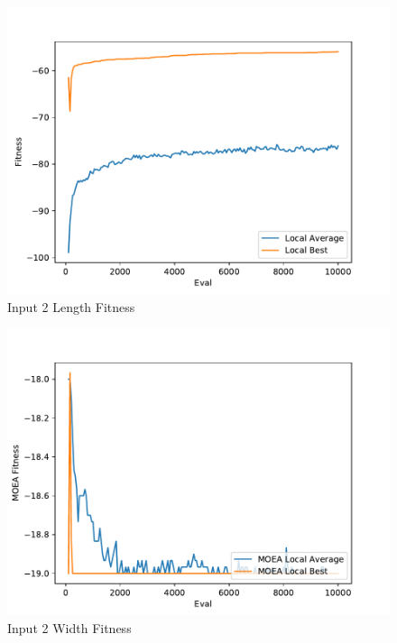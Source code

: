 \documentclass{standalone}
\begin{document}
\begin{figure}[!htb]
	\caption{Input 2 Length Fitness}
	\label{fig:graph_2003}
	\includegraphics[width=\textwidth]{../graphs/graphs/2003.pdf}
\end{figure}


\begin{figure}[!htb]
	\caption{Input 2 Width Fitness}
	\label{fig:graph_2003_moea}
	\includegraphics[width=\textwidth]{../graphs/graphs/2003_moea.pdf}
\end{figure}
\end{document}
